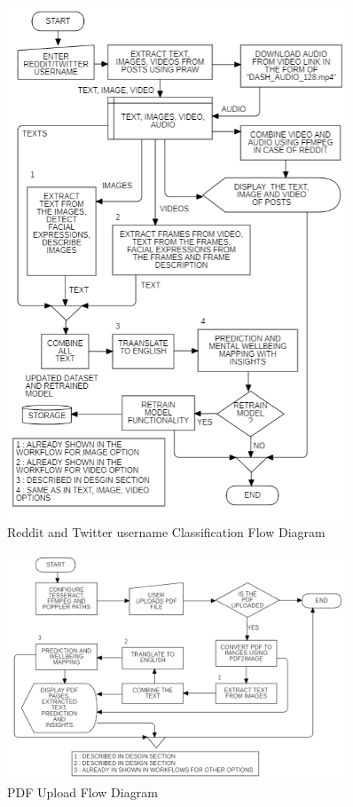 \pagebreak
\begin{figure}[h!]  
    \centering
    \includegraphics[width=0.9\textwidth]{Images/APP REDDIT.png}  
    \caption{Reddit and Twitter username Classification Flow Diagram}
    \label{01234i}  %
\end{figure}


\pagebreak

\begin{figure}[h!]  
    \centering
    \includegraphics[width=0.9\textwidth]{Images/APP PDF.png}  
    \caption{PDF Upload Flow Diagram}
    \label{01234i}  %
\end{figure}


